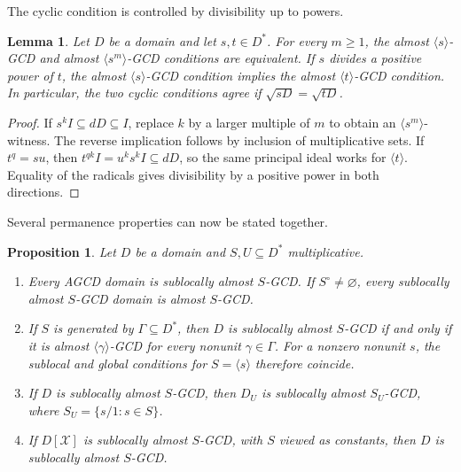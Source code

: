 \documentclass[11pt]{amsart}
\newtheorem{proposition}[theorem]{Proposition}
\newtheorem{lemma}[theorem]{Lemma}
\theoremstyle{definition}
\theoremstyle{remark}
\begin{document}
The cyclic condition is controlled by divisibility up to powers.

\begin{lemma}\label{l:cyclic-power-divisibility}
Let $D$ be a domain and let $s,t\in D^\ast$.
For every $m\geq1$, the almost $\langle s\rangle$-GCD and
almost $\langle s^m\rangle$-GCD conditions are equivalent.
If $s$ divides a positive power of $t$, the almost
$\langle s\rangle$-GCD condition implies the almost
$\langle t\rangle$-GCD condition.
In particular, the two cyclic conditions agree if
$\sqrt{sD}=\sqrt{tD}$.
\end{lemma}

\begin{proof}
If $s^kI\subseteq dD\subseteq I$, replace $k$ by a larger
multiple of $m$ to obtain an $\langle s^m\rangle$-witness.
The reverse implication follows by inclusion of multiplicative
sets. If $t^q=su$, then
$t^{qk}I=u^ks^kI\subseteq dD$, so the same principal ideal
works for $\langle t\rangle$. Equality of the radicals gives
divisibility by a positive power in both directions.
\end{proof}

Several permanence properties can now be stated together.

\begin{proposition}\label{p:sublocal-properties}
\label{c:sublocal-generators}\label{c:principal-sublocal}
\label{p:sublocal-implies-global}\label{p:AGCD-implies-sublocal}
\label{p:sublocal-localization}\label{p:sublocal-polynomial-descent}
Let $D$ be a domain and $S,U\subseteq D^\ast$ multiplicative.
\begin{enumerate}
\item Every AGCD domain is sublocally almost $S$-GCD.
If $S^\circ\ne\varnothing$, every sublocally almost $S$-GCD
domain is almost $S$-GCD.
\item If $S$ is generated by $\Gamma\subseteq D^\ast$, then
$D$ is sublocally almost $S$-GCD if and only if it is almost
$\langle\gamma\rangle$-GCD for every nonunit $\gamma\in\Gamma$.
For a nonzero nonunit $s$, the sublocal and global conditions
for $S=\langle s\rangle$ therefore coincide.
\item If $D$ is sublocally almost $S$-GCD, then $D_U$ is
sublocally almost $S_U$-GCD, where $S_U=\{s/1:s\in S\}$.
\item If $D[\mathcal X]$ is sublocally almost $S$-GCD, with $S$
viewed as constants, then $D$ is sublocally almost $S$-GCD.
\end{enumerate}
\end{proposition}
\end{document}
